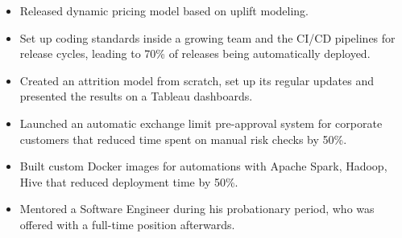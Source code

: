 \begin{itemize}
    \item Released dynamic pricing model based on uplift modeling.
    \item Set up coding standards inside a growing team and the CI/CD pipelines for release cycles, leading to 70\% of releases being automatically deployed.
    \item Created an attrition model from scratch, set up its regular updates and presented the results on a Tableau dashboards.
    \item Launched an automatic exchange limit pre-approval system for corporate customers that reduced time spent on manual risk checks by 50\%.
    \item Built custom Docker images for automations with Apache Spark, Hadoop, Hive that reduced deployment time by 50\%.
    \item Mentored a Software Engineer during his probationary period, who was offered with a full-time position afterwards.
\end{itemize}
